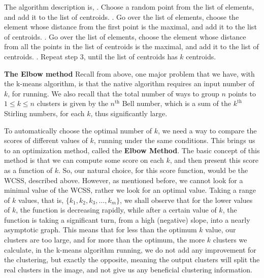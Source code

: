 \documentclass[12pt]{article}
\begin{document}
The algorithm description is, . Choose a random point from the list of elements, and add it to the list of centroids. . Go over the list of elements, choose the element whose distance from the first point is the maximal, and add it to the list of centroids. . Go over the list of elements, choose the element whose distance from all the points in the list of centroids is the maximal, and add it to the list of centroids. . Repeat step 3, until the list of centroids has $k$ centroids. \newline

\textbf{\large The Elbow method} \newline
Recall from above, one major problem that we have, with the k-means algorithm, is that the native algorithm requires an input number of $k$, for running. We also recall that the total number of ways to group $n$ points to $1 \leq k \leq n$ clusters is given by the $n^{\text{th}}$ Bell number, which is a sum of the $k^{\text{th}}$ Stirling numbers, for each $k$, thus significantly large. \newline

To automatically choose the optimal number of $k$, we need a way to compare the scores of different values of $k$, running under the same conditions. This brings us to an optimization method, called the \textbf{Elbow Method}. The basic concept of this method is that we can compute some score on each $k$, and then present this score as a function of $k$. \newline
So, our natural choice, for this score function, would be the WCSS, described above. \newline 
However, as mentioned before, we cannot look for a minimal value of the WCSS, rather we look for an optimal value.
Taking a range of $k$ values, that is, $\{k_1,k_2,k_3,…,k_m \}$, we shall observe that for the lower values of $k$, the function is decreasing rapidly, while after a certain value of $k$, the function is taking a significant turn, from a high (negative) slope, into a nearly asymptotic graph. 
This means that for less than the optimum $k$ value, our clusters are too large, and for more than the optimum, the more $k$ clusters we calculate, in the k-means algorithm running, we do not add any improvement for the clustering, but exactly the opposite, meaning the output clusters will split the real clusters in the image, and not give us any beneficial clustering information. \newline
\end{document}
